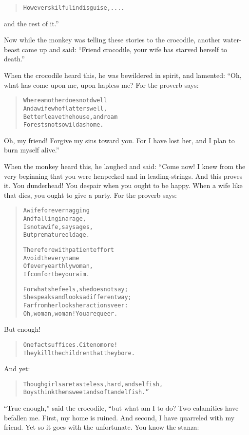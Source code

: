 \documentclass[article, twoside, 10pt]{memoir}
\renewenvironment{verbatim}{%
\begin{quote}%
\vskip -10pt%
\begin{alltt}\normalfont\small}{\end{alltt}%
\end{quote}%
\vskip -10pt
} %
\begin{document}
\begin{verbatim}
However skilful in disguise, ....
\end{verbatim}
and the rest of it.”

Now while the monkey was telling these stories to the crocodile,
another water-beast came up and said:
``Friend crocodile, your wife has starved herself to death.''

When the crocodile heard this, he was bewildered in spirit, and
lamented: “Oh, what has come upon me, upon hapless me? For the
proverb says:

\begin{verbatim}
Where a mother does not dwell
And a wife who flatters well,
Better leave the house, and roam
Forests not so wild as home.
\end{verbatim}
Oh, my friend! Forgive my sins toward you. For I have lost her, and
I plan to burn myself alive.”

When the monkey heard this, he laughed and said: “Come now! I knew
from the very beginning that you were henpecked and in
leading-strings. And this proves it. You dunderhead! You despair
when you ought to be happy. When a wife like that dies, you ought
to give a party. For the proverb says:

\begin{verbatim}
A wife forever nagging
    And falling in a rage,
Is not a wife, say sages,
    But premature old age.

Therefore with patient effort
    Avoid the very name
Of every earthly woman,
    If comfort be your aim.

For what she feels, she does not say;
She speaks and looks a different way;
Far from her looks her actions veer:
Oh, woman, woman! You are queer.
\end{verbatim}
But enough!

\begin{verbatim}
One fact suffices. Cite no more!
They kill the children that they bore.
\end{verbatim}
And yet:

\begin{verbatim}
Though girls are tasteless, hard, and selfish,
Boys think them sweet and soft and elfish.”
\end{verbatim}
``True enough,'' said the crocodile, “but what am I to do? Two
calamities have befallen me. First, my home is ruined. And second,
I have quarreled with my friend. Yet so it goes with the
unfortunate. You know the stanza:
\end{document}
